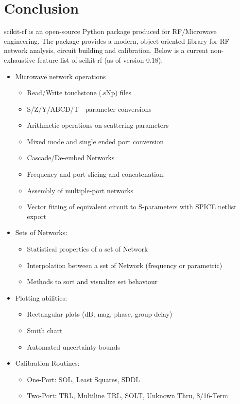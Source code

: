 \documentclass{IEEEjmw}
\begin{document}
\section{Conclusion}
scikit-rf is an open-source Python package produced for RF/Microwave engineering. The package provides a modern, object-oriented library for RF network analysis, circuit building and calibration. Below is a current non-exhaustive feature list of scikit-rf (as of version 0.18).

\begin{itemize}
	\item	Microwave network operations
	\begin{itemize}
	\item	Read/Write touchstone (.sNp) files
	\item	S/Z/Y/ABCD/T - parameter conversions
	\item	Arithmetic operations on scattering parameters
	\item   Mixed mode and single ended port conversion
	\item	Cascade/De-embed Networks
	\item	Frequency and port slicing and concatenation.
	\item   Assembly of multiple-port networks
	\item    Vector fitting of equivalent circuit to S-parameters with SPICE netlist export
	\end{itemize}
\item	Sets of Networks:
	\begin{itemize}
		\item Statistical properties of a set of Network
		\item Interpolation between a set of Network (frequency or parametric)
		\item Methods to sort and visualize set behaviour
	\end{itemize}
\item	Plotting abilities:
	\begin{itemize}
		\item Rectangular plots (dB, mag, phase, group delay)
		\item Smith chart
		\item Automated uncertainty bounds
	\end{itemize}
\item	Calibration Routines:
	\begin{itemize}
		\item One-Port: SOL, Least Squares, SDDL
		\item Two-Port: TRL, Multiline TRL, SOLT, Unknown Thru, 8/16-Term

\end{itemize}
\end{itemize}
\end{document}

